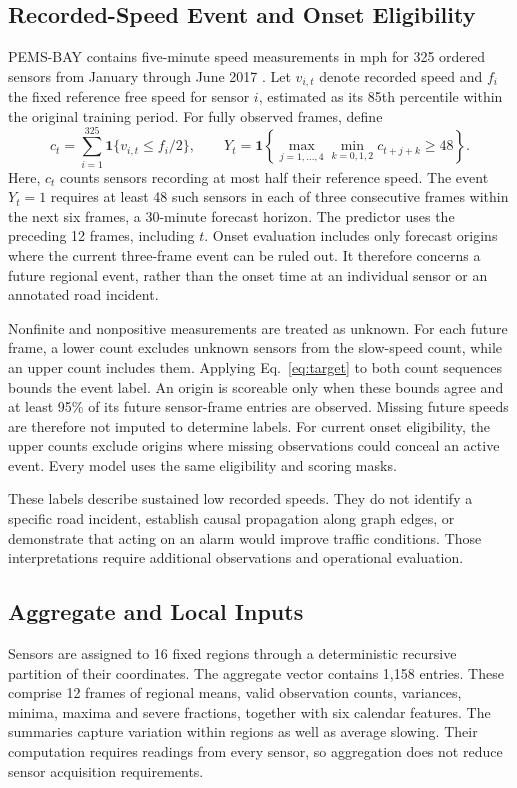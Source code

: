 \documentclass{llncs}
\begin{document}
\subsection{Recorded-Speed Event and Onset Eligibility}
PEMS-BAY contains five-minute speed measurements in mph for 325 ordered sensors from January through June 2017 \cite{dcrnn,release}. Let $v_{i,t}$ denote recorded speed and $f_i$ the fixed reference free speed for sensor $i$, estimated as its 85th percentile within the original training period. For fully observed frames, define
\begin{equation}
 c_t=\sum_{i=1}^{325}\mathbf{1}\{v_{i,t}\leq f_i/2\},\qquad
 Y_t=\mathbf{1}\!\left\{\max_{j=1,\ldots,4}\min_{k=0,1,2}c_{t+j+k}\geq48\right\}.
\label{eq:target}
\end{equation}
Here, $c_t$ counts sensors recording at most half their reference speed. The event $Y_t=1$ requires at least 48 such sensors in each of three consecutive frames within the next six frames, a 30-minute forecast horizon. The predictor uses the preceding 12 frames, including $t$. Onset evaluation includes only forecast origins where the current three-frame event can be ruled out. It therefore concerns a future regional event, rather than the onset time at an individual sensor or an annotated road incident.

Nonfinite and nonpositive measurements are treated as unknown. For each future frame, a lower count excludes unknown sensors from the slow-speed count, while an upper count includes them. Applying Eq.~\ref{eq:target} to both count sequences bounds the event label. An origin is scoreable only when these bounds agree and at least 95\% of its future sensor-frame entries are observed. Missing future speeds are therefore not imputed to determine labels. For current onset eligibility, the upper counts exclude origins where missing observations could conceal an active event. Every model uses the same eligibility and scoring masks.

These labels describe sustained low recorded speeds. They do not identify a specific road incident, establish causal propagation along graph edges, or demonstrate that acting on an alarm would improve traffic conditions. Those interpretations require additional observations and operational evaluation.





\subsection{Aggregate and Local Inputs}
Sensors are assigned to 16 fixed regions through a deterministic recursive partition of their coordinates. The aggregate vector contains 1,158 entries. These comprise 12 frames of regional means, valid observation counts, variances, minima, maxima and severe fractions, together with six calendar features. The summaries capture variation within regions as well as average slowing. Their computation requires readings from every sensor, so aggregation does not reduce sensor acquisition requirements.
\end{document}
